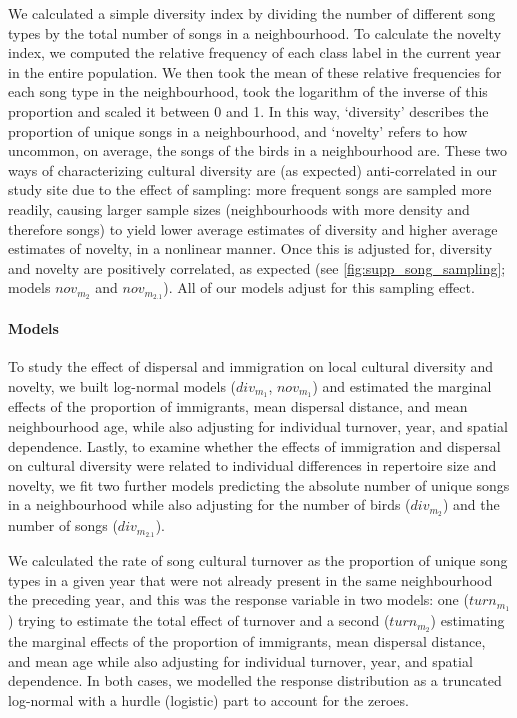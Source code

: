 We calculated a simple diversity index by dividing the number of different song types by the total number of songs in a neighbourhood. To calculate the novelty index, we computed the relative frequency of each class label in the current year in the entire population. We then took the mean of these relative frequencies for each song type in the neighbourhood, took the logarithm of the inverse of this proportion and scaled it between 0 and 1. In this way, ‘diversity’ describes the proportion of unique songs in a neighbourhood, and ‘novelty’ refers to how uncommon, on average, the songs of the birds in a neighbourhood are. These two ways of characterizing cultural diversity are (as expected) anti-correlated in our study site due to the effect of sampling: more frequent songs are sampled more readily, causing larger sample sizes (neighbourhoods with more density and therefore songs) to yield lower average estimates of diversity and higher average estimates of novelty, in a nonlinear manner. Once this is adjusted for, diversity and novelty are positively correlated, as expected (see \autoref{fig:supp_song_sampling}; models $nov_{m_2}$ and $nov_{m_{2.1}}$). All of our models adjust for this sampling effect.

\paragraph{Models}

To study the effect of dispersal and immigration on local cultural diversity and novelty, we built log-normal models ($div_{m_1}$, $nov_{m_1}$) and estimated the marginal effects of the proportion of immigrants, mean dispersal distance, and mean neighbourhood age, while also adjusting for individual turnover, year, and spatial dependence. Lastly, to examine whether the effects of immigration and dispersal on cultural diversity were related to individual differences in repertoire size and novelty, we fit two further models predicting the absolute number of unique songs in a neighbourhood while also adjusting for the number of birds ($div_{m_2}$) and the number of songs ($div_{m_{2.1}}$).

We calculated the rate of song cultural turnover as the proportion of unique song types in a given year that were not already present in the same neighbourhood the preceding year, and this was the response variable in two models: one ($turn_{m_1}$) trying to estimate the total effect of turnover and a second ($turn_{m_2}$) estimating the marginal effects of the proportion of immigrants, mean dispersal distance, and mean age while also adjusting for individual turnover, year, and spatial dependence. In both cases, we modelled the response distribution as a truncated log-normal with a hurdle (logistic) part to account for the zeroes. 



